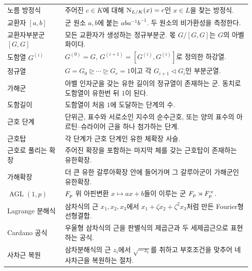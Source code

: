 \begin{longtable}{>{\raggedright\arraybackslash}p{}>{\raggedright\arraybackslash}p{}}
노름 방정식 & 주어진 $c\in K$에 대해 $\operatorname{N}_{L/K}(x)=c$인 $x\in L$을 찾는 방정식. \\
교환자 $[a,b]$ & 군 원소 $a,b$에 붙는 $aba^{-1}b^{-1}$. 두 원소의 비가환성을 측정한다. \\
교환자부분군 $[G,G]$ & 모든 교환자가 생성하는 정규부분군. 몫 $G/[G,G]$는 $G$의 아벨화이다. \\
도함열 $G^{(i)}$ & $G^{(0)}=G$, $G^{(i+1)}=[G^{(i)},G^{(i)}]$로 정의한 하강열. \\
정규열 & $G=G_0\trianglerighteq\cdots\trianglerighteq G_r=1$이고 각 $G_{i+1}\triangleleft G_i$인 부분군열. \\
가해군 & 아벨 인자군을 갖는 유한 길이의 정규열이 존재하는 군. 동치로 도함열이 유한번 뒤 $1$이 된다. \\
도함길이 & 도함열이 처음 $1$에 도달하는 단계의 수. \\
근호 단계 & 단위근, 표수와 서로소인 지수의 순수근호, 또는 양의 표수의 아르틴--슈라이어 근을 하나 첨가하는 단계. \\
근호탑 & 각 단계가 근호 단계인 유한 체확장 사슬. \\
근호로 풀리는 확장 & 주어진 확장을 포함하는 마지막 체를 갖는 근호탑이 존재하는 유한확장. \\
가해확장 & 더 큰 유한 갈루아확장 안에 들어가며 그 갈루아군이 가해군인 유한확장. \\
$\operatorname{AGL}(1,p)$ & $F_p$ 위 아핀변환 $x\mapsto ax+b$들이 이루는 군 $F_p\rtimes F_p^\times$. \\
Lagrange 분해식 & 삼차식의 근 $x_1,x_2,x_3$에서 $x_1+\zeta x_2+\zeta^2x_3$처럼 만든 Fourier형 선형결합. \\
Cardano 공식 & 우울형 삼차식의 근을 판별식의 제곱근과 두 세제곱근으로 표현하는 공식. \\
사차근 복원 & 삼차분해식의 근 $z_i$에서 $\sqrt{-z_i}$를 취하고 부호조건을 맞추어 네 사차근을 복원하는 절차. \\

\end{longtable}
